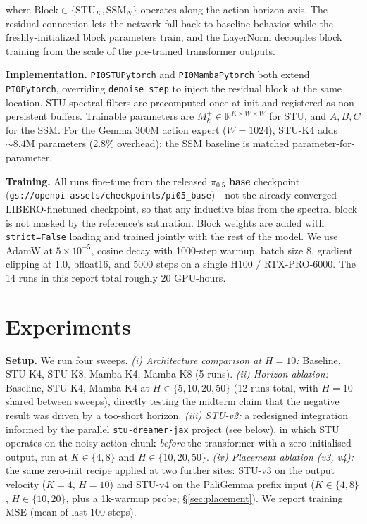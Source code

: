 \documentclass[10pt, letterpaper]{article}
\begin{document}
\noindent where $\mathrm{Block} \in \{\mathrm{STU}_K, \mathrm{SSM}_N\}$ operates along the action-horizon axis. The residual connection lets the network fall back to baseline behavior while the freshly-initialized block parameters train, and the LayerNorm decouples block training from the scale of the pre-trained transformer outputs.

\textbf{Implementation.}
\texttt{PI0STUPytorch} and \texttt{PI0MambaPytorch} both extend \texttt{PI0Pytorch}, overriding \texttt{denoise\_step} to inject the residual block at the same location. STU spectral filters are precomputed once at init and registered as non-persistent buffers. Trainable parameters are $M_k^{\pm} \in \mathbb{R}^{K \times W \times W}$ for STU, and $A, B, C$ for the SSM. For the Gemma 300M action expert ($W{=}1024$), STU-K4 adds $\sim 8.4$M parameters (2.8\% overhead); the SSM baseline is matched parameter-for-parameter.

\textbf{Training.}
All runs fine-tune from the released $\pi_{0.5}$ \textbf{base} checkpoint (\texttt{gs://openpi-assets/checkpoints/pi05\_base})---not the already-converged LIBERO-finetuned checkpoint, so that any inductive bias from the spectral block is not masked by the reference's saturation. Block weights are added with \texttt{strict=False} loading and trained jointly with the rest of the model. We use AdamW at $5{\times}10^{-5}$, cosine decay with 1000-step warmup, batch size 8, gradient clipping at 1.0, bfloat16, and 5000 steps on a single H100 / RTX-PRO-6000. The 14 runs in this report total roughly 20 GPU-hours.

\section*{Experiments}

\textbf{Setup.} We run four sweeps. \emph{(i) Architecture comparison at $H{=}10$:} Baseline, STU-K4, STU-K8, Mamba-K4, Mamba-K8 (5 runs). \emph{(ii) Horizon ablation:} Baseline, STU-K4, Mamba-K4 at $H \in \{5, 10, 20, 50\}$ (12 runs total, with $H{=}10$ shared between sweeps), directly testing the midterm claim that the negative result was driven by a too-short horizon. \emph{(iii) STU-v2:} a redesigned integration informed by the parallel \texttt{stu-dreamer-jax} project (see below), in which STU operates on the noisy action chunk \emph{before} the transformer with a zero-initialised output, run at $K \in \{4, 8\}$ and $H \in \{10, 20, 50\}$. \emph{(iv) Placement ablation (v3, v4):} the same zero-init recipe applied at two further sites: STU-v3 on the output velocity ($K{=}4$, $H{=}10$) and STU-v4 on the PaliGemma prefix input ($K \in \{4, 8\}$, $H \in \{10, 20\}$, plus a 1k-warmup probe; \S\ref{sec:placement}). We report training MSE (mean of last 100 steps).
\end{document}
